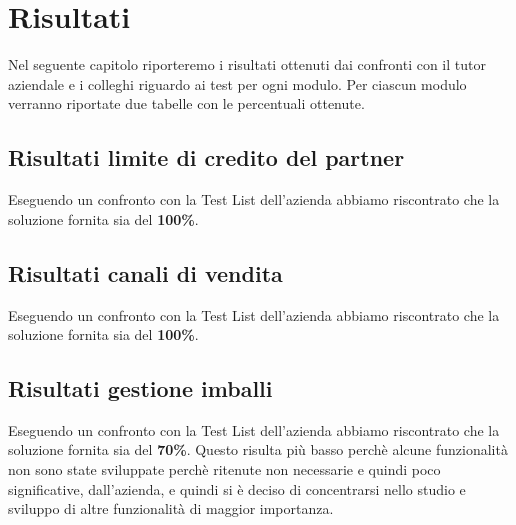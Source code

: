 
\hypertarget{(chap:capitolo7)}{}
\chapter{Risultati}
Nel seguente capitolo riporteremo i risultati ottenuti dai confronti con il tutor aziendale e i colleghi riguardo ai test per ogni modulo.
Per ciascun modulo verranno riportate due tabelle con le percentuali ottenute.


\section{Risultati limite di credito del partner }

Eseguendo un confronto con la Test List dell'azienda abbiamo riscontrato che la soluzione fornita sia del \textbf{100\%}.

\section{Risultati canali di vendita}

Eseguendo un confronto con la Test List dell'azienda abbiamo riscontrato che la soluzione fornita sia del \textbf{100\%}.
\newpage
\section{Risultati gestione imballi}

Eseguendo un confronto con la Test List dell'azienda abbiamo riscontrato che la soluzione fornita sia del \textbf{70\%}.
Questo risulta più basso perchè alcune funzionalità non sono state sviluppate perchè ritenute non necessarie e quindi poco significative, dall'azienda, e quindi si è deciso di concentrarsi nello studio e sviluppo di altre funzionalità di maggior importanza.


